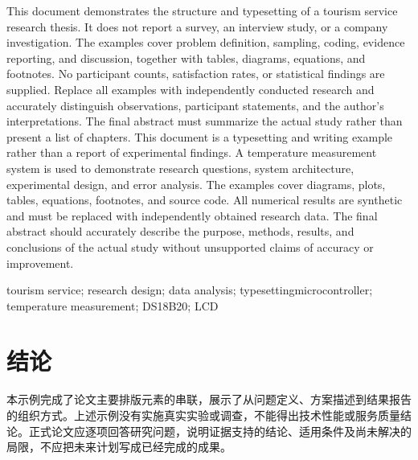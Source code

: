 \documentclass[\HNTcategory]{hntouthesis}
\begin{document}
{\rmfamily{}
\ifhnthuman
This document demonstrates the structure and typesetting of a tourism service research thesis. It does not report a survey, an interview study, or a company investigation. The examples cover problem definition, sampling, coding, evidence reporting, and discussion, together with tables, diagrams, equations, and footnotes. No participant counts, satisfaction rates, or statistical findings are supplied. Replace all examples with independently conducted research and accurately distinguish observations, participant statements, and the author's interpretations. The final abstract must summarize the actual study rather than present a list of chapters.
\else
This document is a typesetting and writing example rather than a report of experimental findings. A temperature measurement system is used to demonstrate research questions, system architecture, experimental design, and error analysis. The examples cover diagrams, plots, tables, equations, footnotes, and source code. All numerical results are synthetic and must be replaced with independently obtained research data. The final abstract should accurately describe the purpose, methods, results, and conclusions of the actual study without unsupported claims of accuracy or improvement.
\fi
\par}

\vspace{0.6em}
 {\rmfamily{}\ifhnthuman tourism service; research design; data analysis; typesetting\else microcontroller; temperature measurement; DS18B20; LCD\fi}

\newpage
\pagestyle{hntfront}
\tableofcontents
\thispagestyle{hntfront}

\newpage
{}
\pagestyle{hntmain}

\ifhnthuman\else\fi

\newpage
\section*{结\quad 论}
本示例完成了论文主要排版元素的串联，展示了从问题定义、方案描述到结果报告的组织方式。上述示例没有实施真实实验或调查，不能得出技术性能或服务质量结论。正式论文应逐项回答研究问题，说明证据支持的结论、适用条件及尚未解决的局限，不应把未来计划写成已经完成的成果。
\end{document}
